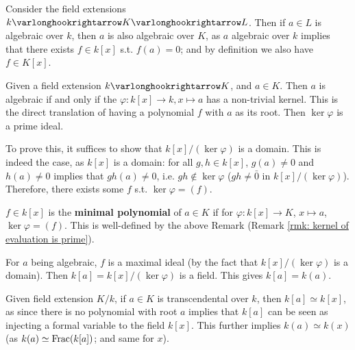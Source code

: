 \documentclass{article}
\begin{document}
\begin{remark}
    Consider the field extensions $k \ext K \ext L$. Then if $a \in L$ is algebraic over $k$, then $a$ is also algebraic over $K$, as $a$ algebraic over $k$ implies that there exists $f \in k[x]$ s.t. $f(a) = 0$; and by definition we also have $f \in K[x]$.
\end{remark}

\begin{remark}\label{rmk: kernel of evaluation is prime}
    Given a field extension $k \ext K$, and $a \in K$. Then $a$ is algebraic if and only if the $\varphi: k[x] \to k, x \mapsto a$ has a non-trivial kernel. This is the direct translation of having a polynomial $f$ with $a$ as its root. Then $\ker \varphi$ is a prime ideal.
        
    To prove this, it suffices to show that $k[x]/(\ker \varphi)$ is a domain. This is indeed the case, as $k[x]$ is a domain: for all $g, h \in k[x]$, $g(a) \neq 0$ and $h(a) \neq 0$ implies that $gh(a) \neq 0$, i.e. $gh \notin \ker \varphi$ ($gh \neq \bar{0}$ in $k[x]/(\ker \varphi)$). Therefore, there exists some $f$ s.t. $\ker \varphi = (f)$.
\end{remark}

\begin{definition}
    $f \in k[x]$ is the \textbf{minimal polynomial} of $a \in K$ if for $\varphi: k[x] \to K$, $x \mapsto a$, $\ker \varphi = (f)$. This is well-defined by the above Remark (Remark \ref{rmk: kernel of evaluation is prime}).
\end{definition}

\begin{remark}\label{rmk: algebraic implies k[a] = k(a)}
    For $a$ being algebraic, $f$ is a maximal ideal (by the fact that $k[x]/(\ker \varphi)$ is a domain). Then $k[a] = k[x]/(\ker \varphi)$ is a field. This gives $k[a] = k(a)$.
\end{remark}

\begin{remark}
    Given field extension $K/k$, if $a \in K$ is transcendental over $k$, then $k[a] \simeq k[x]$, as since there is no polynomial with root $a$ implies that $k[a]$ can be seen as injecting a formal variable to the field $k[x]$. This further implies $k(a) \simeq k(x)$ (as $k(a) \simeq \mathrm{Frac}(k[a])$; and same for $x$).
\end{remark}
\end{document}
